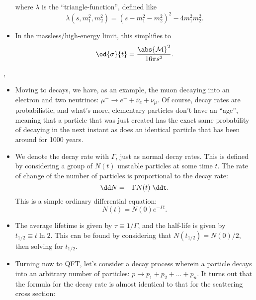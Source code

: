 \begin{itemize}
\begin{equation*}
        \end{equation*}
        where $\lambda$ is the ``triangle-function'', defined like
        \begin{equation}
            \lambda(s, m_1^2, m_2^2) = (s - m_1^2 - m_2^2)^2 - 4m_1^2m_2^2.
        \end{equation}
    \item In the massless/high-energy limit, this simplifies to
        \begin{equation}
            \od{\sigma}{t} = \frac{\abs{\mathcal{M}}^2}{16\pi s^2}.
        \end{equation}
\end{itemize}

\sep


\begin{itemize}
    \item Moving to decays, we have, as an example, the muon decaying into an electron and two neutrinos: $\mu^- \rightarrow e^- + \bar{\nu}_e + \nu_{\mu}$. Of course, decay rates are probabilistic, and what's more, elementary particles don't have an ``age'', meaning that a particle that was just created has the exact same probability of decaying in the next instant as does an identical particle that has been around for 1000 years.
    \item We denote the decay rate with $\Gamma$, just as normal decay rates. This is defined by considering a group of $N(t)$ unstable particles at some time $t$. The rate of change of the number of particles is proportional to the decay rate:
        \begin{equation*}
            \dd N = - \Gamma N(t) \;\ddt.
        \end{equation*}
        This is a simple ordinary differential equation:
        \begin{equation*}
            N(t) = N(0)e^{-\Gamma t}.
        \end{equation*}
    \item The average lifetime is given by $\tau \equiv 1/\Gamma$, and the half-life is given by $t_{1/2} \equiv t\ln2$. This can be found by considering that $N(t_{1/2}) = N(0)/2$, then solving for $t_{1/2}$.
    \item Turning now to QFT, let's consider a decay process wherein a particle decays into an arbitrary number of particles: $p \rightarrow p_1 + p_2 + \ldots + p_n$. It turns out that the formula for the decay rate is almost identical to that for the scattering cross section:
        \begin{equation}

\end{equation}
\end{itemize}
